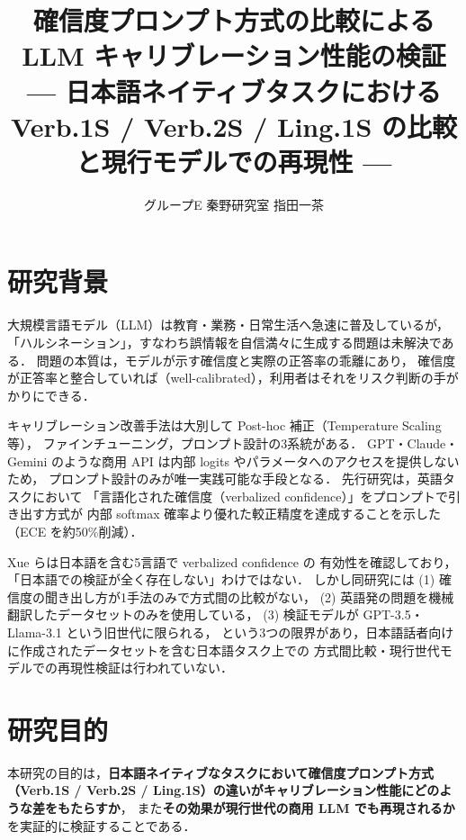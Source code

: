 \documentclass[10pt,a4paper,twocolumn]{article}
\title{\large\bfseries 確信度プロンプト方式の比較による LLM キャリブレーション性能の検証\\
{\normalsize --- 日本語ネイティブタスクにおける Verb.1S / Verb.2S / Ling.1S の比較と現行モデルでの再現性 ---}}
\author{\normalsize グループE \quad 秦野研究室 \quad 7422048 \quad 指田一茶}
\date{}
\begin{document}
\maketitle
\thispagestyle{empty}

\section{研究背景}

大規模言語モデル（LLM）は教育・業務・日常生活へ急速に普及しているが，
「ハルシネーション」，すなわち誤情報を自信満々に生成する問題は未解決である\cite{ji2023survey}．
問題の本質は，モデルが示す確信度と実際の正答率の乖離にあり，
確信度が正答率と整合していれば（well-calibrated），利用者はそれをリスク判断の手がかりにできる．

キャリブレーション改善手法は大別して Post-hoc 補正（Temperature Scaling 等），
ファインチューニング，プロンプト設計の3系統がある．
GPT・Claude・Gemini のような商用 API は内部 logits やパラメータへのアクセスを提供しないため，
プロンプト設計のみが唯一実践可能な手段となる\cite{xie2024blackboxsurvey}．
先行研究\cite{tian2023just,xiong2024can}は，英語タスクにおいて
「言語化された確信度（verbalized confidence）」をプロンプトで引き出す方式が
内部 softmax 確率より優れた較正精度を達成することを示した（ECE を約50\%削減）．

Xue ら\cite{xue2025mlingconf}は日本語を含む5言語で verbalized confidence の
有効性を確認しており，「日本語での検証が全く存在しない」わけではない．
しかし同研究には (1) 確信度の聞き出し方が1手法のみで方式間の比較がない，
(2) 英語発の問題を機械翻訳したデータセットのみを使用している，
(3) 検証モデルが GPT-3.5・Llama-3.1 という旧世代に限られる，
という3つの限界があり，日本語話者向けに作成されたデータセットを含む日本語タスク上での
方式間比較・現行世代モデルでの再現性検証は行われていない．

\section{研究目的}

本研究の目的は，\textbf{日本語ネイティブなタスクにおいて確信度プロンプト方式
（Verb.1S / Verb.2S / Ling.1S）の違いがキャリブレーション性能にどのような差をもたらすか}，
また\textbf{その効果が現行世代の商用 LLM でも再現されるか}を実証的に検証することである．
\end{document}
